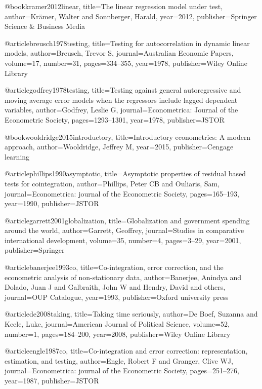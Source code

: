 @book{kramer2012linear,
  title={The linear regression model under test},
  author={Kr{\"a}mer, Walter and Sonnberger, Harald},
  year={2012},
  publisher={Springer Science \& Business Media}
}

@article{breusch1978testing,
  title={Testing for autocorrelation in dynamic linear models},
  author={Breusch, Trevor S},
  journal={Australian Economic Papers},
  volume={17},
  number={31},
  pages={334--355},
  year={1978},
  publisher={Wiley Online Library}
}

@article{godfrey1978testing,
  title={Testing against general autoregressive and moving average error models when the regressors include lagged dependent variables},
  author={Godfrey, Leslie G},
  journal={Econometrica: Journal of the Econometric Society},
  pages={1293--1301},
  year={1978},
  publisher={JSTOR}
}

@book{wooldridge2015introductory,
  title={Introductory econometrics: A modern approach},
  author={Wooldridge, Jeffrey M},
  year={2015},
  publisher={Cengage learning}
}

@article{phillips1990asymptotic,
  title={Asymptotic properties of residual based tests for cointegration},
  author={Phillips, Peter CB and Ouliaris, Sam},
  journal={Econometrica: journal of the Econometric Society},
  pages={165--193},
  year={1990},
  publisher={JSTOR}
}

@article{garrett2001globalization,
  title={Globalization and government spending around the world},
  author={Garrett, Geoffrey},
  journal={Studies in comparative international development},
  volume={35},
  number={4},
  pages={3--29},
  year={2001},
  publisher={Springer}
}

@article{banerjee1993co,
  title={Co-integration, error correction, and the econometric analysis of non-stationary data},
  author={Banerjee, Anindya and Dolado, Juan J and Galbraith, John W and Hendry, David and others},
  journal={OUP Catalogue},
  year={1993},
  publisher={Oxford university press}
}

@article{de2008taking,
  title={Taking time seriously},
  author={De Boef, Suzanna and Keele, Luke},
  journal={American Journal of Political Science},
  volume={52},
  number={1},
  pages={184--200},
  year={2008},
  publisher={Wiley Online Library}
}

@article{engle1987co,
  title={Co-integration and error correction: representation, estimation, and testing},
  author={Engle, Robert F and Granger, Clive WJ},
  journal={Econometrica: journal of the Econometric Society},
  pages={251--276},
  year={1987},
  publisher={JSTOR}
}

